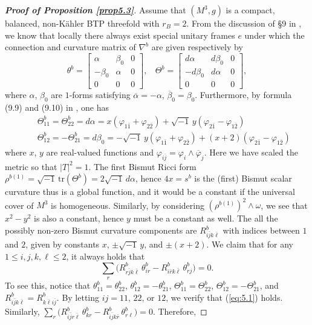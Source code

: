 \documentclass{amsart}
\numberwithin{equation}{section}
\theoremstyle{definition}
\renewcommand{\1}{\mathds{1}}
\renewcommand{\>}{\rightarrow}
\begin{document}
\begin{proof}[{\bf Proof of Proposition \ref{prop5.3}}]
Assume that $(M^3,g)$ is a compact, balanced, non-K\"ahler {\rm BTP} threefold with $r_B=2$. From the discussion of \S 9 in \cite{ZhaoZ22}, we know that locally there always exist special unitary frames $e$ under which the connection and curvature matrix of $\nabla^b$ are given respectively by
$$ \theta^b = \left[ \begin{array}{ccc} \alpha & \beta_0 & 0 \\ - \beta_0 & \alpha & 0 \\ 0 & 0 & 0 \end{array} \right] , \ \ \ \  \Theta^b = \left[ \begin{array}{ccc} d\alpha & d\beta_0 & 0 \\ - d\beta_0 & d\alpha & 0 \\ 0 & 0 & 0 \end{array} \right] , $$
where $\alpha$, $\beta_0$ are $1$-forms satisfying $\overline{\alpha}=-\alpha$, $\overline{\beta}_0=\beta_0$. Furthermore, by formula (9.9) and (9.10) in \cite{ZhaoZ22}, one has
\begin{eqnarray*}
&& \Theta^b_{11} = \Theta^b_{22} = d\alpha = x (\varphi_{1\bar{1}} + \varphi_{2\bar{2}}) + \sqrt{-1}\,y (\varphi_{2\bar{1}} - \varphi_{1\bar{2}}) \\
&& \Theta^b_{12} = - \Theta^b_{21} = d\beta_0 = -\sqrt{-1}\,y (\varphi_{1\bar{1}} + \varphi_{2\bar{2}}) + (x+2) (\varphi_{2\bar{1}} - \varphi_{1\bar{2}})
\end{eqnarray*}
where $x$, $y$ are real-valued functions and $\varphi_{i\bar{j}} = \varphi_i \wedge \overline{\varphi}_j$. Here we have scaled the metric so that $|T|^2=1$.  The first Bismut Ricci form $\rho^{b(1)}=\sqrt{-1}\,\mbox{tr}(\Theta^b)=2\sqrt{-1}\,d\alpha$, hence $4x=s^b$ is the (first) Bismut scalar curvature thus is a global function, and it would be a constant if the universal cover of $M^3$ is homogeneous. Similarly, by considering $(\rho^{b(1)})^2 \wedge \omega$, we see that $x^2-y^2$ is also a constant, hence $y$ must be a constant as well. The all the possibly non-zero Bismut curvature components are $R^b_{i\bar{j}k\bar{\ell}}$ with indices between $1$ and $2$, given by constants $x$, $\pm \sqrt{-1}\,y$, and $\pm (x+2)$.  We claim that for any $1\leq i,j,k, \ell \leq 2$, it always holds that
\begin{equation} \label{eq:5.1}
 \sum_r \big( R^b_{r\bar{j}k\bar{\ell}} \,\theta^b_{ir} - R^b_{i\bar{r}k\bar{\ell}} \,\theta^b_{rj} \big) = 0.
 \end{equation}
To see this, notice that $\theta^b_{11}=\theta^b_{22}$, $\theta^b_{12}=-\theta^b_{21}$,  $\Theta^b_{11}=\Theta^b_{22}$, $\Theta^b_{12}=-\Theta^b_{21}$, and $R^b_{i\bar{j}k\bar{\ell}} = R^b_{k\bar{\ell}i\bar{j} }$. By letting $ij=11$, $22$, or $12$, we verify that (\ref{eq:5.1}) holds. Similarly, $ \sum_r \big( R^b_{i\bar{j}r\bar{\ell}} \,\theta^b_{kr} - R^b_{i\bar{j}k\bar{r}} \,\theta^b_{r\ell} \big) = 0$. Therefore,

\end{proof}
\end{document}
